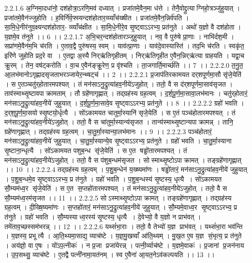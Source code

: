 2.2.1.6
अ॒ग्निमा॒दधा॑नो॒ दश॑होत्रा॒ऽरणि॒मव॑ दध्यात् । प्रजा॑तमे॒वैन॒मा ध॑त्ते । तेनै॒वोद्द्रुत्याग्निहो॒त्रञ्जु॑हुयात् । प्रजा॑तमे॒वैन॑ज्जुहोति । ह॒विर्नि॑र्व॒फ्स्यन्दश॑होतार॒व्य्याँच॑ख्षीत । प्रजा॑तमे॒वैन॒न्निर्व॑पति । सा॒मि॒धे॒नीर॑नुव॒क्ष्यन्दश॑होतार॒- व्व्याँच॑क्षीत । सा॒मि॒धे॒नीरे॒व सृ॒ष्ट्वाऽऽरभ्य॒ प्रत॑नुते । अथो॑ य॒ज्ञो वै दश॑होता । य॒ज्ञमे॒व त॑नुते ।। 6 ।।
2.2.1.7
अ॒भि॒चर॒न्दश॑होतारञ्जुहुयात् । नव॒ वै पुरु॑षे प्रा॒णाः । नाभि॑र्दश॒मी । सप्रा॑णमे॒वैन॑म॒भि च॑रति । ए॒ताव॒द्वै पुरु॑षस्य॒ स्वम् । याव॑त्प्रा॒णाः । याव॑दे॒वास्यास्ति॑ । तद॒भि च॑रति । स्वकृ॑त॒ इरि॑णे जुहोति प्रद॒रे वा । ए॒तद्वा अ॒स्यै निर्‌ऋ॑तिगृहीतम् । निर्‌ऋ॑तिगृहीत ए॒वैन॒न्निर्‌ऋ॑त्या ग्राहयति । यद्वा॒च क्रू॒रम् । तेन॒ वष॑ट्करोति । वा॒च ए॒वैन॑ङ्क्रू॒रेण॒ प्र वृ॑श्चति । ता॒जगार्ति॒मार्च्छ॑ति ।। 7 ।।
2.2.2.0
त॒नु॒त॒ आ॒लभ॑मानोऽगृह्णादसृजताभरञ्जायेर॒न्थ्षट्च॑ ।। 2 ।।
2.2.2.1
प्र॒जाप॑तिरकामयत दर्‌शपूर्णमा॒सौ सृ॑जे॒येति॑ । स ए॒तञ्चतु॑र्‌होतारमपश्यत् । तं मन॑साऽनु॒द्रुत्या॑हव॒नीये॑ऽजुहोत् । ततो॒ वै स द॑र्‌शपूर्णमा॒साव॑सृजत । ताव॑स्माथ्सृ॒ष्टावपाक्रामताम् । तौ ग्रहे॑णागृह्णात् । तद्ग्रह॑स्य ग्रह॒त्वम् । द॒र्श॒पू॒र्ण॒मा॒सावा॒लभ॑मानः । चतु॑र्‌होतारं॒ मन॑साऽनु॒द्रुत्या॑हव॒नीये॑ जुहुयात् । द॒र्श॒पू॒र्ण॒मा॒सावे॒व सृ॒ष्ट्वाऽऽरभ्य॒ प्रत॑नुते ।। 8 ।।
2.2.2.2
ग्रहो॑ भवति । द॒र्‌श॒पू॒र्ण॒मा॒सयोस्सृ॒ष्टयो॒र्धृत्यै । सो॑ऽकामयत चातुर्मा॒स्यानि॑ सृजे॒येति॑ । स ए॒तं पञ्च॑होतारमपश्यत् । तं मन॑साऽनु॒द्रुत्या॑हव॒नीये॑ऽजुहोत् । ततो॒ वै स चा॑तुर्मा॒स्यान्य॑सृजत । तान्य॑स्माथ्सृ॒ष्टान्यपाक्रामन्न् । तानि॒ ग्रहे॑णागृह्णात् । तद्ग्रह॑स्य ग्रह॒त्वम् । चा॒तु॒र्मा॒स्यान्या॒लभ॑मानः ।। 9 ।।
2.2.2.3
पञ्च॑होतारं॒ मन॑साऽनु॒द्रुत्या॑हव॒नीये॑ जुहुयात् । चा॒तु॒र्मा॒स्यान्ये॒व सृ॒ष्ट्वाऽऽरभ्य॒ प्रत॑नुते । ग्रहो॑ भवति । चा॒तु॒र्मा॒स्याना॑ सृ॒ष्टाना॒न्धृत्यै । सो॑ऽकामयत पशुब॒न्ध सृ॑जे॒येति॑ । स ए॒त षड्ढो॑तारमपश्यत् । तं मन॑साऽनु॒द्रुत्या॑हव॒नीये॑ऽजुहोत् । ततो॒ वै स प॑शुब॒न्धम॑सृजत । सोस्माथ्सृ॒ष्टोऽपाक्रामत् । तङ्ग्रहे॑णागृह्णात् ।। 10 ।।
2.2.2.4
तद्ग्रह॑स्य ग्रह॒त्वम् । प॒शु॒ब॒न्धेन॑ य॒ख्ष्यमा॑णः । षड्ढो॑तारं॒ मन॑साऽनु॒द्रुत्या॑हव॒नीये॑ जुहुयात् । प॒शु॒ब॒न्धमे॒व सृ॒ष्ट्वाऽऽरभ्य॒ प्र त॑नुते । ग्रहो॑ भवति । प॒शु॒ब॒न्धस्य॑ सृ॒ष्टस्य॒ धृत्यै । सो॑ऽकामयत सौ॒म्यम॑ध्व॒र सृ॑जे॒येति॑ । स ए॒त स॒प्तहो॑तारमपश्यत् । तं मन॑साऽनु॒द्रुत्या॑हव॒नीये॑ऽजुहोत् । ततो॒ वै स सौ॒म्यम॑ध्व॒रम॑सृजत ।। 11 ।।
2.2.2.5
सोऽस्माथ्सृ॒ष्टोऽपाक्रामत् । तङ्ग्रहे॑णागृह्णात् । तद्ग्रह॑स्य ग्रह॒त्वम् । दी॒ख्षि॒ष्यमा॑णः । स॒प्तहो॑तारं॒ मन॑साऽनु॒द्रुत्या॑हव॒नीये॑ जुहुयात् । सौ॒म्यमे॒वाध्व॒र सृ॒ष्ट्वाऽऽरभ्य॒ प्र त॑नुते । ग्रहो॑ भवति । सौ॒म्यस्याध्व॒रस्य॑ सृ॒ष्टस्य॒ धृत्यै । दे॒वेभ्यो॒ वै य॒ज्ञो न प्राभ॑वत् । तमे॑ताव॒च्छस्सम॑भरन्न् ।। 12 ।।
2.2.2.6
यथ्सं॑भा॒राः । ततो॒ वै तेभ्यो॑ य॒ज्ञ प्राभ॑वत् । यथ्सं॑भा॒रा भव॑न्ति । य॒ज्ञस्य॒ प्रभूत्यै । आ॒ति॒थ्यमा॒साद्य॒ व्याच॑ष्टे । य॒ज्ञ॒मु॒खव्वाँ आ॑ति॒थ्यम् । मु॒ख॒त ए॒व य॒ज्ञ सं॒भृत्य॒ प्र त॑नुते । अय॑ज्ञो॒ वा ए॒षः । यो॑ऽप॒त्नीकः॑ । न प्र॒जा प्रजा॑येरन्न् । पत्नी॒र्व्याच॑ष्टे । य॒ज्ञमे॒वाकः॑ । प्र॒जानां प्र॒जन॑नाय । उ॒प॒सथ्सु॒ व्याच॑ष्टे । ए॒तद्वै पत्नी॑नामा॒यत॑नम् । स्व ए॒वैना॑ आ॒यत॒नेऽव॑कल्पयति ।। 13 ।।
